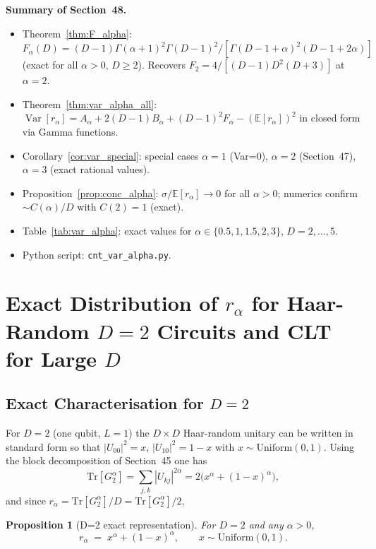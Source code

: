 \documentclass[12pt,a4paper]{article}
\newtheorem{proposition}[theorem]{Proposition}
\begin{document}
\noindent\textbf{Summary of Section~48.}
\begin{itemize}
\item Theorem~\ref{thm:F_alpha}: $F_\alpha(D)=(D-1)\Gamma(\alpha+1)^2\Gamma(D-1)^2/[\Gamma(D-1+\alpha)^2(D-1+2\alpha)]$
  (exact for all $\alpha>0$, $D\geq2$).  Recovers $F_2=4/[(D-1)D^2(D+3)]$ at $\alpha=2$.
\item Theorem~\ref{thm:var_alpha_all}: $\operatorname{Var}[r_\alpha]=A_\alpha+2(D-1)B_\alpha+(D-1)^2F_\alpha-(\mathbb{E}[r_\alpha])^2$
  in closed form via Gamma functions.
\item Corollary~\ref{cor:var_special}: special cases $\alpha=1$ (Var=0),
  $\alpha=2$ (Section~47), $\alpha=3$ (exact rational values).
\item Proposition~\ref{prop:conc_alpha}: $\sigma/\mathbb{E}[r_\alpha]\to0$ for all $\alpha>0$;
  numerics confirm $\sim C(\alpha)/D$ with $C(2)=1$ (exact).
\item Table~\ref{tab:var_alpha}: exact values for $\alpha\in\{0.5,1,1.5,2,3\}$, $D=2,\ldots,5$.
\item Python script: \texttt{cnt\_var\_alpha.py}.
\end{itemize}

\section{Exact Distribution of $r_\alpha$ for Haar-Random $D=2$ Circuits and CLT for Large $D$}
\label{sec:distribution}

\subsection{Exact Characterisation for $D=2$}
\label{subsec:dist_D2}

For $D=2$ (one qubit, $L=1$) the $D\times D$ Haar-random unitary can be written in standard
form so that $|U_{00}|^2=x$, $|U_{10}|^2=1-x$ with $x\sim\mathrm{Uniform}(0,1)$.
Using the block decomposition of Section~45 one has
\[
  \mathrm{Tr}[G_2^\alpha]=\sum_{j,k}|U_{kj}|^{2\alpha}
  =2\bigl(x^\alpha+(1-x)^\alpha\bigr),
\]
and since $r_\alpha=\mathrm{Tr}[G_2^\alpha]/D=\mathrm{Tr}[G_2^\alpha]/2$,

\begin{proposition}[D=2 exact representation]\label{prop:r_alpha_D2}
For $D=2$ and any $\alpha>0$,
\[
  r_\alpha \;=\; x^\alpha+(1-x)^\alpha,\qquad x\sim\mathrm{Uniform}(0,1).
\]
\end{proposition}
\end{document}
